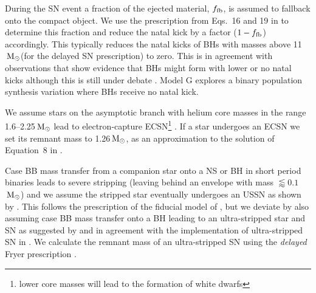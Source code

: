 \documentclass[twocolumn]{aastex63}
\newcommand{\Msun}{\ensuremath{\,\rm{M}_{\odot}}\xspace}
\begin{document}
  During the \ac{SN}  event a fraction of the ejected material, $f_{\rm{fb}}$, is assumed to fallback onto the compact object. We use the prescription from Eqs.~16 and 19 in  \citet{2012ApJ...749...91F} to determine this fraction and reduce the natal kick by a factor ($1-f_{\rm{fb}}$) accordingly. This typically reduces the natal kicks of BHs with masses above 11\Msun  (for the delayed \ac{SN}  prescription) to zero. This is in agreement with observations  that show evidence that  BHs might form with lower or no natal kicks although this is still under debate  \citep[][]{1999A&A...352L..87N,2012MNRAS.425.2799R,2013MNRAS.434.1355J,2015MNRAS.453.3341R,2016MNRAS.456..578M}.    Model G explores a binary population synthesis variation where \acp{BH} receive no natal kick. %
 
 We assume stars on the asymptotic branch with helium core masses in the range  1.6--2.25\Msun \citep{2002MNRAS.329..897H}  lead to electron-capture \ac{ECSN}\footnote{lower  core masses will lead to the formation of white dwarfs} \citep{1980PASJ...32..303M, 1984ApJ...277..791N,1987ApJ...322..206N, 2008MNRAS.386..553I}. 
If a star undergoes an \ac{ECSN}  we set its remnant mass to 1.26\Msun, as an approximation to the solution of Equation~8 in \citet{1996ApJ...457..834T}.


Case BB mass transfer from a companion star onto a \ac{NS} or \ac{BH} in short period binaries leads to severe stripping (leaving behind an envelope with mass $\lessapprox 0.1$\Msun) and we assume the stripped star eventually undergoes an \ac{USSN}  as shown by \citet{2013ApJ...778L..23T,2015MNRAS.451.2123T, 2015MNRAS.454.3073S, 2017MNRAS.466.2085M,2018MNRAS.479.3675M}. This follows the prescription of the fiducial model of \citet{2018MNRAS.481.4009V}, but we deviate by also assuming case BB mass transfer onto a \ac{BH}  leading to an ultra-stripped star and \ac{SN}  as suggested by \citet{2013ApJ...778L..23T,2015MNRAS.451.2123T}  and in agreement with the implementation of ultra-stripped \ac{SN}  in \citet[][]{2018MNRAS.481.1908K, 2019arXiv191100903B}.   We calculate the remnant mass of an ultra-stripped \ac{SN}  using the \textit{delayed} Fryer prescription \citep{2012ApJ...749...91F}. 
\end{document}
